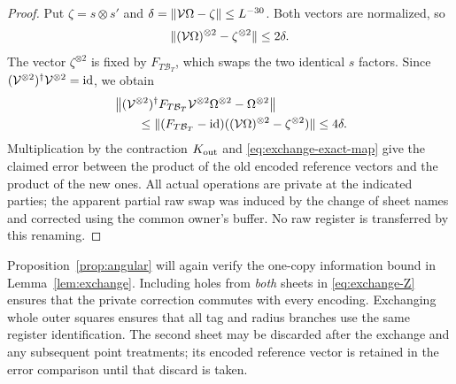 \begin{proof}
Put $\zeta=s\otimes s'$ and
$\delta=\lVert \mathcal V\Omega-\zeta\rVert\le L^{-30}$.  Both vectors are
normalized, so
\[
 \lVert (\mathcal V\Omega)^{\otimes2}-\zeta^{\otimes2}\rVert
      \le2\delta.
\]
The vector $\zeta^{\otimes2}$ is fixed by $F_{T\mathcal B_T}$, which swaps
the two identical $s$ factors.  Since
$(\mathcal V^{\otimes2})^{\dagger}\mathcal V^{\otimes2}=\operatorname{id}$, we obtain
\begin{align*}
 &\left\|
   (\mathcal V^{\otimes2})^{\dagger}F_{T\mathcal B_T}
        \mathcal V^{\otimes2}\Omega^{\otimes2}-\Omega^{\otimes2}
   \right\|\\
 &\hspace{2em}\le
   \lVert (F_{T\mathcal B_T}-\operatorname{id})
                    ((\mathcal V\Omega)^{\otimes2}-\zeta^{\otimes2})\rVert
       \le4\delta.
\end{align*}
Multiplication by the contraction $K_{\rm out}$ and
\eqref{eq:exchange-exact-map} give the claimed error between the product
of the old encoded reference vectors and the product of the new ones.
All actual operations are private at the indicated parties; the apparent
partial raw swap was induced by the change of sheet names and corrected
using the common owner's buffer.  No raw register is transferred by this
renaming.
\end{proof}

Proposition~\ref{prop:angular} will again verify the one-copy information
bound in Lemma~\ref{lem:exchange}.  Including holes from \emph{both} sheets
in \eqref{eq:exchange-Z} ensures that the private correction commutes with
every encoding.  Exchanging whole outer squares ensures that all tag and
radius branches use the same register identification.  The second sheet
may be discarded after the exchange and any subsequent point treatments;
its encoded reference vector is retained in the error comparison until
that discard is taken.
